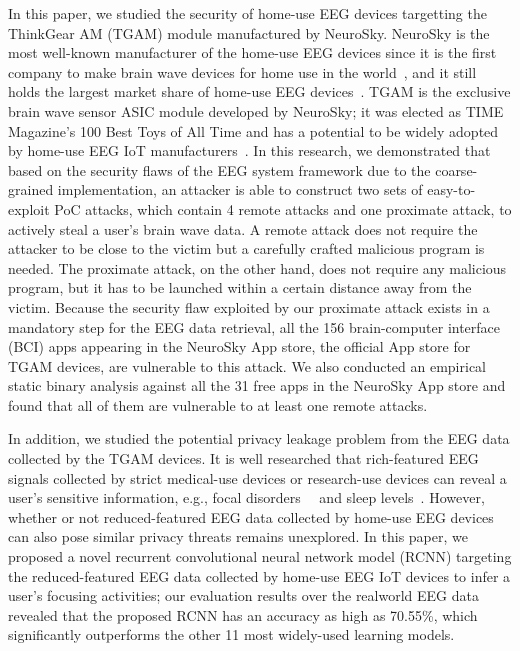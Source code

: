 \indent In this paper, we studied the security of home-use EEG devices targetting the ThinkGear AM (TGAM) module manufactured by NeuroSky. NeuroSky is the most well-known manufacturer of the home-use EEG devices since it is the first company to make brain wave devices for home use in the world~\cite{firsthomeeeg}, and it still holds the largest market share of home-use EEG devices~\cite{neuroskymarket}. TGAM is the exclusive brain wave sensor ASIC module developed by NeuroSky; it was elected as TIME Magazine's 100 Best Toys of All Time and has a potential to be widely adopted by home-use EEG IoT manufacturers~\cite{tgammarket}. In this research, we demonstrated that based on the security flaws of the EEG system framework due to the coarse-grained implementation, an attacker is able to construct two sets of easy-to-exploit PoC attacks, which contain 4 remote attacks and one proximate attack, to actively steal a user's brain wave data. A remote attack does not require the attacker to be close to the victim but a carefully crafted malicious program is needed. The proximate attack, on the other hand, does not require any malicious program, but it has to be launched within a certain distance away from the victim. %
Because the security flaw exploited by our proximate attack exists in a mandatory step for the EEG data retrieval, all the 156 brain-computer interface (BCI) apps appearing in the NeuroSky App store, the official App store for TGAM devices, are vulnerable to this attack. We also conducted an empirical static binary analysis against all the 31 free apps in the NeuroSky App store and found that all of them are vulnerable to at least one remote attacks. %

\indent In addition, we studied the potential privacy leakage problem from the EEG data collected by the TGAM devices. It is well researched that rich-featured EEG signals collected by strict medical-use devices or research-use devices can reveal a user's sensitive information, e.g., focal disorders~\cite{eegdiagnosis}~\cite{dauwels2010diagnosis} and sleep levels~\cite{nakamura2017automatic}. However, whether or not reduced-featured EEG data collected by home-use EEG devices can also pose similar privacy threats remains unexplored. In this paper, we proposed a novel recurrent convolutional neural network model (RCNN) targeting the reduced-featured EEG data collected by home-use EEG IoT devices to infer a user's focusing activities; our evaluation results over the realworld EEG data revealed that the proposed RCNN has an accuracy as high as 70.55\%, which significantly outperforms the other 11 most widely-used learning models.

